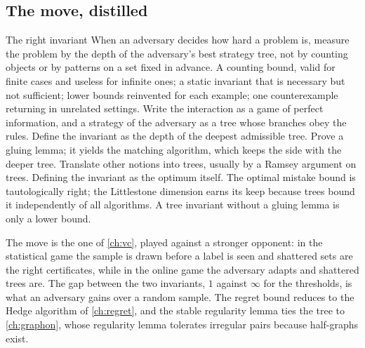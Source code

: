 \begin{refsection}
\section{The move, distilled}\label{sec:littlestone:distilled}

\begin{move}{The right invariant}
 When an adversary decides how hard a problem is, measure the problem by the depth of the adversary's best strategy tree, not by counting objects or by patterns on a set fixed in advance.
 A counting bound, valid for finite cases and useless for infinite ones; a static invariant that is necessary but not sufficient; lower bounds reinvented for each example; one counterexample returning in unrelated settings.
 Write the interaction as a game of perfect information, and a strategy of the adversary as a tree whose branches obey the rules. Define the invariant as the depth of the deepest admissible tree. Prove a gluing lemma; it yields the matching algorithm, which keeps the side with the deeper tree. Translate other notions into trees, usually by a Ramsey argument on trees.
 Defining the invariant as the optimum itself. The optimal mistake bound is tautologically right; the Littlestone dimension earns its keep because trees bound it independently of all algorithms. A tree invariant without a gluing lemma is only a lower bound.
\end{move}


The move is the one of \cref{ch:vc}, played against a stronger opponent: in the statistical game the sample is drawn before a label is seen and shattered sets are the right certificates, while in the online game the adversary adapts and shattered trees are. The gap between the two invariants, $1$ against $\infty$ for the thresholds, is what an adversary gains over a random sample. The regret bound reduces to the Hedge algorithm of \cref{ch:regret}, and the stable regularity lemma ties the tree to \cref{ch:graphon}, whose regularity lemma tolerates irregular pairs because half-graphs exist.


\end{refsection}
